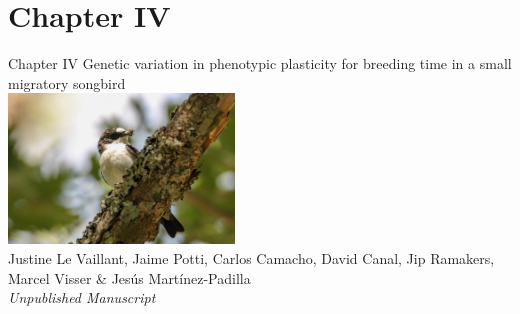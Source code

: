 \documentclass[compress]{beamer}
\begin{document}
\section{Chapter IV}
\begin{frame}{Chapter IV}
\centering 
\large{Genetic variation in phenotypic plasticity for breeding time in a small migratory songbird} \\
\vfill
\includegraphics[height = 4cm]{Photos/Feeding male.jpg}\\
Justine Le Vaillant, Jaime Potti, Carlos Camacho, David Canal, Jip Ramakers, Marcel Visser \& Jes\'{u}s Mart\'{i}nez-Padilla \\
\vfill \small{\textit{Unpublished Manuscript}
}

\end{frame}

\end{document}
